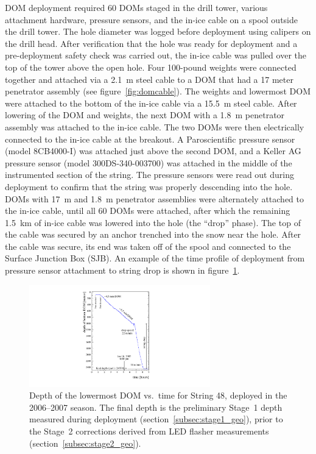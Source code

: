 DOM deployment required 60 DOMs staged in the drill tower, various
attachment hardware, pressure sensors, and the in-ice cable on a spool
outside the drill tower. The hole diameter was logged before deployment
using calipers on the drill head. After verification that the hole was 
ready for deployment and a pre-deployment safety check was carried out, the in-ice cable
was pulled over the top of the tower above the open hole. Four 100-pound
weights were connected together and attached via a 2.1~m steel cable to a
DOM that had a 17 meter penetrator assembly (see figure~\ref{fig:domcable}). The weights and
lowermost DOM were attached to the bottom of the in-ice cable via a 15.5~m
steel cable. After lowering of the DOM and weights, the next DOM with a
1.8~m penetrator assembly was attached to the in-ice cable. The two DOMs were
then electrically connected to the in-ice cable at the breakout. A
Paroscientific pressure sensor (model 8CB4000-I) was attached just above
the second DOM, and a Keller AG pressure sensor (model 300DS-340-003700)
was attached in the middle of the 
instrumented section of the string. The
pressure sensors were read out during deployment to confirm that the string
was properly descending into the hole.   DOMs with 17~m and
1.8~m penetrator assemblies were alternately attached to the in-ice 
cable, until all 60 DOMs were attached, after which the remaining 1.5~km of
in-ice cable was lowered into the hole (the ``drop'' phase). The top of the
cable was secured by an anchor trenched into the snow near the hole. After the
cable was secure, its end was taken off of the spool and connected to the
Surface Junction Box (SJB). An example of the time profile of deployment from pressure sensor
attachment to string drop is shown in figure~\ref{fig:deploytime}.

\begin{figure}[!ht]
 \centering
 \includegraphics[width=0.70\textwidth]{graphics/drill/String48_deploy.pdf}
\caption{Depth of the lowermost DOM vs.~time for String 48, deployed in the
  2006--2007 season. The final depth is the preliminary Stage~1 depth
  measured during deployment (section~\ref{subsec:stage1_geo}),
prior to the Stage~2 corrections derived from LED flasher
measurements (section~\ref{subsec:stage2_geo}).}
\label{fig:deploytime}
\end{figure}

